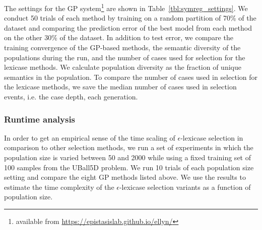 \documentclass[twoside]{article}
\begin{document}
The settings for the GP system\footnote{available from \url{https://epistasislab.github.io/ellyn/}} are shown in Table~\ref{tbl:symreg_settings}. We conduct 50 trials of each method by training on a random partition of 70\% of the dataset and comparing the prediction error of the best model from each method on the other 30\% of the dataset. In addition to test error, we compare the training convergence of the GP-based methods, the semantic diversity of the populations during the run, and the number of cases used for selection for the lexicase methods. We calculate population diversity as the fraction of unique semantics in the population. To compare the number of cases used in selection for the lexicase methods, we save the median number of cases used in selection events, i.e. the case depth, each generation. 

\subsubsection{Runtime analysis}
In order to get an empirical sense of the time scaling of $\epsilon$-lexicase selection in comparison to other selection methods, we run a set of experiments in which the population size is varied between 50 and 2000 while using a fixed training set of 100 samples from the UBall5D problem. We run 10 trials of each population size setting and compare the eight GP methods listed above. We use the results to estimate the time complexity of the $\epsilon$-lexicase selection variants as a function of population size. 
\end{document}
